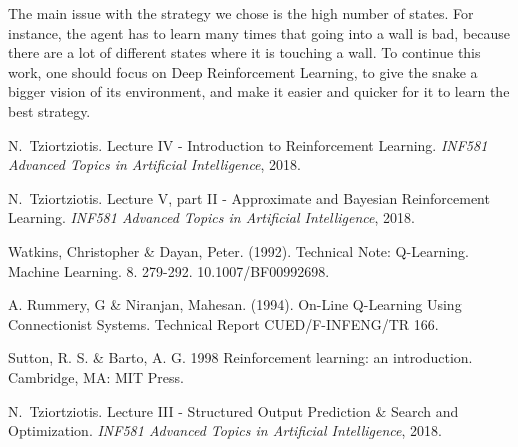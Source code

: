 \documentclass[journal, a4paper]{IEEEtran}
\begin{document}
    The main issue with the strategy we chose is the high number of states.
    For instance, the agent has to learn many times that going into a wall is bad, because there are a lot of different states where it is touching a wall.
    To continue this work, one should focus on Deep Reinforcement Learning, to give the snake a bigger vision of its environment, and make it easier and quicker for it to learn the best strategy.

\begin{thebibliography}{4}

	N.~Tziortziotis. Lecture IV - Introduction to Reinforcement Learning. \textit{INF581 Advanced Topics in Artificial Intelligence}, 2018.

	N.~Tziortziotis. Lecture V, part II - Approximate and Bayesian Reinforcement Learning. \textit{INF581 Advanced Topics in Artificial Intelligence}, 2018.

	Watkins, Christopher \& Dayan, Peter. (1992). Technical Note: Q-Learning. Machine Learning. 8. 279-292. 10.1007/BF00992698. 

	A. Rummery, G \& Niranjan, Mahesan. (1994). On-Line Q-Learning Using Connectionist Systems. Technical Report CUED/F-INFENG/TR 166. 

    Sutton, R. S. \& Barto, A. G. 1998 Reinforcement learning: an introduction. Cambridge, MA: MIT Press.
	
	N.~Tziortziotis. Lecture III - Structured Output Prediction \& Search and Optimization. \textit{INF581 Advanced Topics in Artificial Intelligence}, 2018.
\end{thebibliography}
\end{document}
